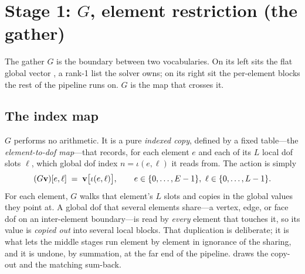 \section{Stage 1: \texorpdfstring{$G$}{G}, element restriction (the gather)}
\label{sec:appk-gather}

The gather $G$ is the boundary between two vocabularies. On its left sits the
flat global vector \code{[(N: \dots)]}, a rank-1 list the solver owns; on its right
sit the per-element blocks \code{[(E, L)]} the rest of the pipeline runs on. $G$
is the map that crosses it.

\subsection{The index map}

$G$ performs no arithmetic. It is a pure \emph{indexed copy}, defined by a fixed
table---the \emph{element-to-dof map}---that records, for each element $e$ and each
of its $L$ local dof slots $\ell$, which global dof index $n = \iota(e,\ell)$ it
reads from. The action is simply
\begin{equation}
  (G\mathbf{v})[e,\ell] \;=\; \mathbf{v}\bigl[\iota(e,\ell)\bigr],
  \qquad e\in\{0,\dots,E-1\},\ \ell\in\{0,\dots,L-1\}.
  \label{eq:appk-gather}
\end{equation}
For each element, $G$ walks that element's $L$ slots and copies in the global
values they point at. A global dof that several elements share---a vertex,
edge, or face dof on an inter-element boundary---is read by \emph{every} element
that touches it, so its value is \emph{copied out} into several local blocks. That
duplication is deliberate; it is what lets the middle stages run element by element
in ignorance of the sharing, and it is undone, by summation, at the far end of the
pipeline.  draws the copy-out and the matching
sum-back.

